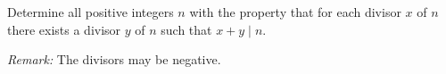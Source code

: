 Determine all positive integers $n$ with the property that for each divisor $x$ of $n$ there
exists a divisor $y$ of $n$ such that $x+y\mid n$.

\emph{Remark:} The divisors may be negative.
